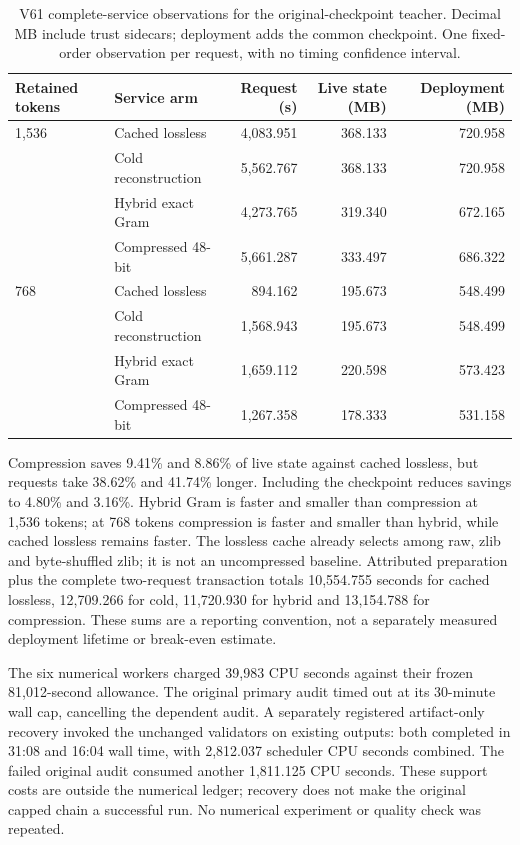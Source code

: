 \documentclass[10pt,twocolumn,letterpaper]{article}
\begin{document}
\begin{table}[t]
\centering\small
\begin{tabular}{llrrr}
\toprule
Retained tokens & Service arm & Request (s) & Live state (MB) & Deployment (MB) \\
\midrule
1,536 & Cached lossless & 4,083.951 & 368.133 & 720.958 \\
  & Cold reconstruction & 5,562.767 & 368.133 & 720.958 \\
  & Hybrid exact Gram & 4,273.765 & 319.340 & 672.165 \\
  & Compressed 48-bit & 5,661.287 & 333.497 & 686.322 \\
\midrule
768 & Cached lossless & 894.162 & 195.673 & 548.499 \\
  & Cold reconstruction & 1,568.943 & 195.673 & 548.499 \\
  & Hybrid exact Gram & 1,659.112 & 220.598 & 573.423 \\
  & Compressed 48-bit & 1,267.358 & 178.333 & 531.158 \\
\bottomrule
\end{tabular}
\caption{V61 complete-service observations for the original-checkpoint teacher.
Decimal MB include trust sidecars; deployment adds the common checkpoint.
One fixed-order observation per request, with no timing confidence interval.}
\label{tab:v61}
\end{table}

Compression saves 9.41\% and 8.86\% of live state against cached lossless,
but requests take 38.62\% and 41.74\% longer. Including the checkpoint reduces
savings to 4.80\% and 3.16\%. Hybrid Gram is faster and smaller than compression
at 1,536 tokens; at 768 tokens compression is faster and smaller than hybrid,
while cached lossless remains faster. The lossless cache already selects among
raw, zlib and byte-shuffled zlib; it is not an uncompressed baseline.
Attributed preparation plus the complete two-request transaction totals
10,554.755 seconds for cached lossless, 12,709.266 for cold, 11,720.930 for hybrid
and 13,154.788 for compression. These sums are a reporting convention, not a
separately measured deployment lifetime or break-even estimate.

The six numerical workers charged 39,983 CPU seconds against their frozen
81,012-second allowance. The original primary audit timed out at its 30-minute
wall cap, cancelling the dependent audit. A separately registered artifact-only
recovery invoked the unchanged validators on existing outputs: both completed
in 31:08 and 16:04 wall time, with 2,812.037 scheduler CPU seconds combined.
The failed original audit consumed another 1,811.125 CPU seconds. These support
costs are outside the numerical ledger; recovery does not make the original
capped chain a successful run. No numerical experiment or quality check was repeated.
\end{document}
